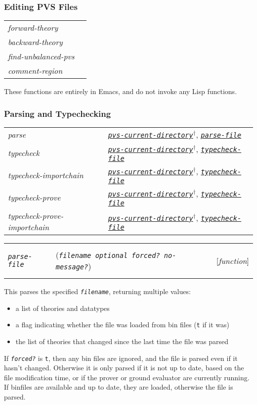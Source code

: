 \documentclass[12pt]{book}
\makeatletter
\def\ampoptional{{\smaller\sc {\smaller\smaller \&}optional\ }}
\newenvironment{function}[3]%
{\par\noindent\begin{boxedminipage}{\textwidth}%
 \par\noindent\begin{tabularx}{\linewidth}{l>{\raggedright}Xr}%
 \functionhtgt{#1}&(\texttt{\textit{#2}})&[\emph{#3}]%
 \end{tabularx}\par\flushright\begin{minipage}{.97\textwidth}}
{\end{minipage}\end{boxedminipage}}
\newcommand{\functionarg}[1]{\texttt{\textit{#1}}}
\newcommand{\functionnm}[1]{\texttt{\textit{#1}}}
\newcommand{\functionhln}[1]{\hyperlink{#1}{\functionnm{#1}}}
\newcommand{\functionhtgt}[1]{\hypertarget{#1}{\functionnm{#1}}\index{#1@\functionnm{#1}|underline}}
\newenvironment{lispfunction}[2]%
{\begin{function}{#1}{#2}{function}}{\end{function}}
\makeatother
\begin{document}
\subsubsection{Editing PVS Files}
\noindent\begin{tabularx}{\linewidth}{|>{\itshape\ttfamily}l|>{\raggedright\arraybackslash}X|}\hline
  forward-theory & \\
  backward-theory & \\
  find-unbalanced-pvs & \\
  comment-region & \\ \hline
\end{tabularx}

These functions are entirely in Emacs, and do not invoke any Lisp functions.

\subsubsection{Parsing and Typechecking}
\noindent\begin{tabularx}{\linewidth}{|>{\itshape\ttfamily}l|>{\raggedright\arraybackslash}X|}\hline
  parse & \functionhln{pvs-current-directory}$^\dagger$,
          \functionhln{parse-file} \\
  typecheck
    & \functionhln{pvs-current-directory}$^\dagger$,
      \functionhln{typecheck-file} \\
  typecheck-importchain
    & \functionhln{pvs-current-directory}$^\dagger$,
      \functionhln{typecheck-file} \\
  typecheck-prove
    & \functionhln{pvs-current-directory}$^\dagger$,
      \functionhln{typecheck-file} \\
  typecheck-prove-importchain
    & \functionhln{pvs-current-directory}$^\dagger$,
      \functionhln{typecheck-file} \\ \hline
\end{tabularx}

\begin{lispfunction}{parse-file}
  {filename \ampoptional forced? no-message?}
This parses the specified \functionarg{filename}, returning multiple
values:
\begin{itemize}
\item a list of theories and datatypes
\item a flag indicating whether the file was loaded from bin files
(\texttt{t} if it was)
\item the list of theories that changed since the last time the file was
parsed
\end{itemize}

If \functionarg{forced?} is \texttt{t}, then any bin files are ignored,
and the file is parsed even if it hasn't changed.  Otherwise it is only
parsed if it is not up to date, based on the file modification time, or if
the prover or ground evaluator are currently running.  If binfiles are
available and up to date, they are loaded, otherwise the file is parsed.
\end{lispfunction}
\end{document}
